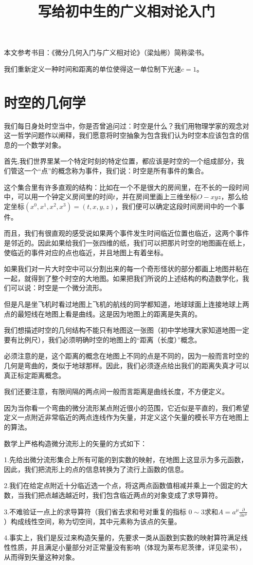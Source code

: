 \documentclass{article}
\begin{document}
\title{写给初中生的广义相对论入门}
\maketitle
本文参考书目：《微分几何入门与广义相对论》（梁灿彬）简称梁书。

我们重新定义一种时间和距离的单位使得这一单位制下光速$c=1$。
\section{时空的几何学}
我们每日身处时空当中，你是否曾追问过：时空是什么？我们用物理学家的观念对这一哲学问题作以阐释，我们愿意将时空抽象为包含我们认为时空本应该包含的信息的一个数学对象。

首先,我们世界里某一个特定时刻的特定位置，都应该是时空的一个组成部分，我们管这一个“点”的概念称为事件，我们说：时空是所有事件的集合。

这个集合里有许多直观的结构：比如在一个不是很大的房间里，在不长的一段时间中，可以用一个钟定义房间里的时间$t$，并在房间里画上三维坐标$O-xyz$，那么给定坐标$(x^0,x^1,x^2,x^3)=(t,x,y,z)$，我们便可以确定这段时间房间中的一个事件。

而且，我们有很直观的感受说如果两个事件发生时间临近位置也临近，这两个事件是邻近的。因此如果给我们一张四维的纸，我们可以把那片时空的地图画在纸上，使临近的事件对应的点也临近，并且地图上有着坐标。

如果我们对一片大时空中可以分割出来的每一个奇形怪状的部分都画上地图并粘在一起，就得到了整个时空的大地图。如果把我们所说的上述结构的构造数学化，我们可以说：时空是一个微分流形。

但是凡是坐飞机时看过地图上飞机的航线的同学都知道，地球球面上连接地球上两点的最短线在地图上看是曲线。这是因为地图上的距离是失真的。

我们想描述时空的几何结构不能只有地图这一张图（初中学地理大家知道地图一定要有比例尺），我们必须明确时空的地图上的“距离（长度）”概念。

必须注意的是，这个距离的概念在地图上不同的点是不同的，因为一般而言时空的几何是弯曲的，类似于地球那样。因此，我们必须逐点给出我们的距离失真才可以真正标定距离概念。

我们还要注意，有限间隔的两点间一般而言距离是曲线长度，不方便定义。

因为当你看一个弯曲的微分流形某点附近很小的范围，它近似是平直的，我们希望定义一点附近非常临近的两点连线作为矢量，并定义这个矢量的模长平方在地图上的算法。

数学上严格构造微分流形上的矢量的方式如下：

1.先给出微分流形集合上所有可能的到实数的映射，在地图上这显示为多元函数，因此，我们把流形上的点的信息转换为了流行上函数的信息。

2.我们在给定点附近十分临近选一个点，将这两点函数值相减并乘上一个固定的大数，当我们把点越选越近时，我们包含临近两点的对象变成了求导算符。

3.不难验证一点上的求导算符（我们省去求和号对重复的指标 $ 0 \sim 3 $求和$A=a^\mu \frac{\partial}{\partial x^\mu }$）构成线性空间，称为切空间，其中元素称为该点的矢量。

4.事实上，我们是反过来构造矢量的，先要求一类从函数到实数的映射算符满足线性性质，并且满足小量部分对正常量没有影响（体现为莱布尼茨律，详见梁书），从而得到矢量这种对象。
\end{document}
